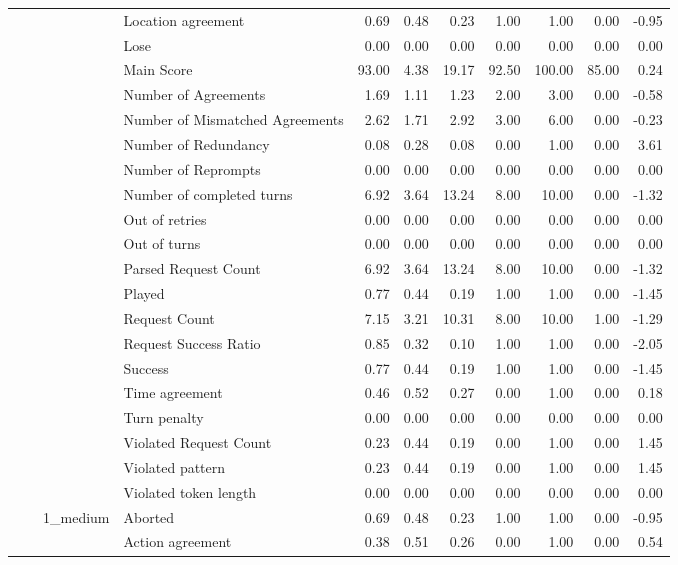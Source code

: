 \begin{tabular}{llllrrrrrrr}
 &  &  & Location agreement & 0.69 & 0.48 & 0.23 & 1.00 & 1.00 & 0.00 & -0.95 \\
 &  &  & Lose & 0.00 & 0.00 & 0.00 & 0.00 & 0.00 & 0.00 & 0.00 \\
 &  &  & Main Score & 93.00 & 4.38 & 19.17 & 92.50 & 100.00 & 85.00 & 0.24 \\
 &  &  & Number of Agreements & 1.69 & 1.11 & 1.23 & 2.00 & 3.00 & 0.00 & -0.58 \\
 &  &  & Number of Mismatched Agreements & 2.62 & 1.71 & 2.92 & 3.00 & 6.00 & 0.00 & -0.23 \\
 &  &  & Number of Redundancy & 0.08 & 0.28 & 0.08 & 0.00 & 1.00 & 0.00 & 3.61 \\
 &  &  & Number of Reprompts & 0.00 & 0.00 & 0.00 & 0.00 & 0.00 & 0.00 & 0.00 \\
 &  &  & Number of completed turns & 6.92 & 3.64 & 13.24 & 8.00 & 10.00 & 0.00 & -1.32 \\
 &  &  & Out of retries & 0.00 & 0.00 & 0.00 & 0.00 & 0.00 & 0.00 & 0.00 \\
 &  &  & Out of turns & 0.00 & 0.00 & 0.00 & 0.00 & 0.00 & 0.00 & 0.00 \\
 &  &  & Parsed Request Count & 6.92 & 3.64 & 13.24 & 8.00 & 10.00 & 0.00 & -1.32 \\
 &  &  & Played & 0.77 & 0.44 & 0.19 & 1.00 & 1.00 & 0.00 & -1.45 \\
 &  &  & Request Count & 7.15 & 3.21 & 10.31 & 8.00 & 10.00 & 1.00 & -1.29 \\
 &  &  & Request Success Ratio & 0.85 & 0.32 & 0.10 & 1.00 & 1.00 & 0.00 & -2.05 \\
 &  &  & Success & 0.77 & 0.44 & 0.19 & 1.00 & 1.00 & 0.00 & -1.45 \\
 &  &  & Time agreement & 0.46 & 0.52 & 0.27 & 0.00 & 1.00 & 0.00 & 0.18 \\
 &  &  & Turn penalty & 0.00 & 0.00 & 0.00 & 0.00 & 0.00 & 0.00 & 0.00 \\
 &  &  & Violated Request Count & 0.23 & 0.44 & 0.19 & 0.00 & 1.00 & 0.00 & 1.45 \\
 &  &  & Violated pattern & 0.23 & 0.44 & 0.19 & 0.00 & 1.00 & 0.00 & 1.45 \\
 &  &  & Violated token length & 0.00 & 0.00 & 0.00 & 0.00 & 0.00 & 0.00 & 0.00 \\
\cline{3-11}
 &  & \multirow[t]{27}{*}{1_medium} & Aborted & 0.69 & 0.48 & 0.23 & 1.00 & 1.00 & 0.00 & -0.95 \\
 &  &  & Action agreement & 0.38 & 0.51 & 0.26 & 0.00 & 1.00 & 0.00 & 0.54 \\

\end{tabular}
